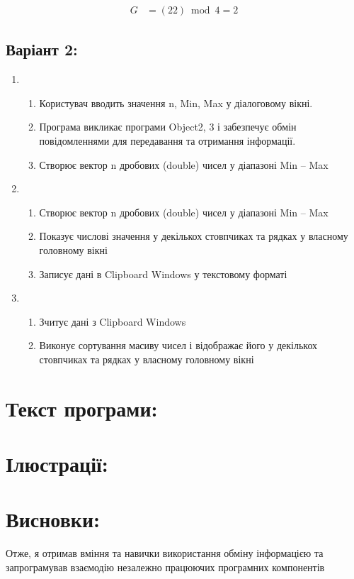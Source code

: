 \documentclass[14pt]{article}
\begin{document}
    \begin{align}
        G &= (22) \bmod 4 = 2
    \end{align}

    \subsection{Варіант 2:}
    \begin{enumerate}
        \item \begin{enumerate}
                  \item    Користувач вводить значення n, Min, Max у діалоговому вікні.
                  \item    Програма викликає програми Object2, 3 і забезпечує обмін повідомленнями для передавання та отримання інформації.
                  \item    Створює вектор n дробових (double) чисел у діапазоні Min – Max
        \end{enumerate}
        \item \begin{enumerate}
                  \item    Створює вектор n дробових (double) чисел у діапазоні Min – Max
                  \item    Показує числові значення у декількох стовпчиках та рядках у власному головному вікні
                  \item    Записує дані в Clipboard Windows у текстовому форматі
        \end{enumerate}
        \item \begin{enumerate}
                  \item    Зчитує дані з Clipboard Windows
                  \item    Виконує сортування масиву чисел і відображає його у декількох стовпчиках та рядках у власному головному вікні
        \end{enumerate}
    \end{enumerate}


    \section{Текст програми:}
    


    \section{Ілюстрації:}
    


    \section{Висновки:}
    Отже, я отримав вміння та навички використання обміну інформацією та запрограмував взаємодію незалежно працюючих програмних компонентів
\end{document}
